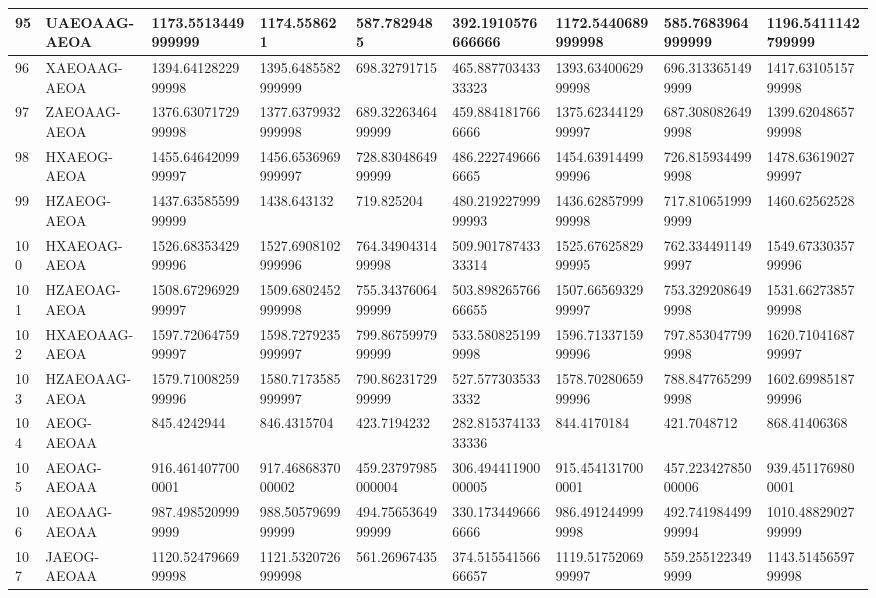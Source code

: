 {\begin{longtable}{|l|l|l|l|l|l|l|l|l|}
        95 & UAEOAAG-AEOA & 1173.5513449999999 & 1174.558621 & 587.7829485 & 392.1910576666666 & 1172.5440689999998 & 585.7683964999999 & 1196.5411142799999 \\ \hline
        96 & XAEOAAG-AEOA & 1394.6412822999998 & 1395.6485582999999 & 698.32791715 & 465.88770343333323 & 1393.6340062999998 & 696.3133651499999 & 1417.6310515799998 \\ \hline
        97 & ZAEOAAG-AEOA & 1376.6307172999998 & 1377.6379932999998 & 689.3226346499999 & 459.8841817666666 & 1375.6234412999997 & 687.3080826499998 & 1399.6204865799998 \\ \hline
        98 & HXAEOG-AEOA & 1455.6464209999997 & 1456.6536969999997 & 728.8304864999999 & 486.2227496666665 & 1454.6391449999996 & 726.8159344999998 & 1478.6361902799997 \\ \hline
        99 & HZAEOG-AEOA & 1437.6358559999999 & 1438.643132 & 719.825204 & 480.21922799999993 & 1436.6285799999998 & 717.8106519999999 & 1460.62562528 \\ \hline
        100 & HXAEOAG-AEOA & 1526.6835342999996 & 1527.6908102999996 & 764.3490431499998 & 509.90178743333314 & 1525.6762582999995 & 762.3344911499997 & 1549.6733035799996 \\ \hline
        101 & HZAEOAG-AEOA & 1508.6729692999997 & 1509.6802452999998 & 755.3437606499999 & 503.89826576666655 & 1507.6656932999997 & 753.3292086499998 & 1531.6627385799998 \\ \hline
        102 & HXAEOAAG-AEOA & 1597.7206475999997 & 1598.7279235999997 & 799.8675997999999 & 533.5808251999998 & 1596.7133715999996 & 797.8530477999998 & 1620.7104168799997 \\ \hline
        103 & HZAEOAAG-AEOA & 1579.7100825999996 & 1580.7173585999997 & 790.8623172999999 & 527.5773035333332 & 1578.7028065999996 & 788.8477652999998 & 1602.6998518799996 \\ \hline
        104 & AEOG-AEOAA & 845.4242944 & 846.4315704 & 423.7194232 & 282.81537413333336 & 844.4170184 & 421.7048712 & 868.41406368 \\ \hline
        105 & AEOAG-AEOAA & 916.4614077000001 & 917.4686837000002 & 459.23797985000004 & 306.49441190000005 & 915.4541317000001 & 457.22342785000006 & 939.4511769800001 \\ \hline
        106 & AEOAAG-AEOAA & 987.4985209999999 & 988.5057969999999 & 494.7565364999999 & 330.1734496666666 & 986.4912449999998 & 492.74198449999994 & 1010.4882902799999 \\ \hline
        107 & JAEOG-AEOAA & 1120.5247966999998 & 1121.5320726999998 & 561.26967435 & 374.51554156666657 & 1119.5175206999997 & 559.2551223499999 & 1143.5145659799998 \\ \hline

\end{longtable}}
